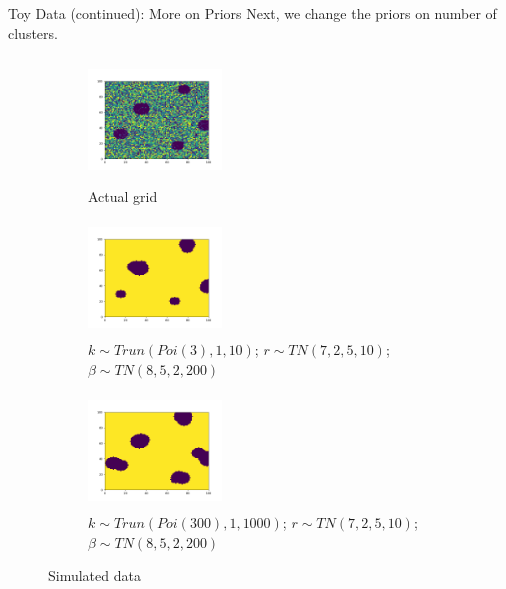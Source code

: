 \documentclass[10pt,mathserif]{beamer}
\begin{document}
\begin{frame}{Toy Data (continued): More on Priors}
Next, we change the priors on number of clusters.
\begin{figure}[t!]
    \centering
    \begin{subfigure}[t]{0.3\textwidth}
        \centering
        \includegraphics[height=1.3in, width=1.4in]{../sim_toydata2D_mu8/BDC_gridactual}
        \caption{Actual grid}
    \end{subfigure}%
    \begin{subfigure}[t]{0.3\textwidth}
        \centering
        \includegraphics[height=1.2in, width=1.4in]{../sim_toydata2D_mu8/BDC_grid7_c3}
        \caption{ $k \sim Trun(Poi(3), 1, 10)$; $r \sim TN(7, 2, 5, 10)$; $\beta \sim TN(8, 5, 2, 200)$}
    \end{subfigure}%
        \begin{subfigure}[t]{0.3\textwidth}
        \centering
        \includegraphics[height=1.2in, width=1.4in]{../sim_toydata2D_mu8/BDC_grid8_c300}
        \caption{ $k \sim Trun(Poi(300), 1, 1000)$; $r \sim TN(7, 2, 5, 10)$; $\beta \sim TN(8, 5, 2, 200)$}
    \end{subfigure}
    \caption{Simulated data}
\end{figure}
\end{frame}
\end{document}
